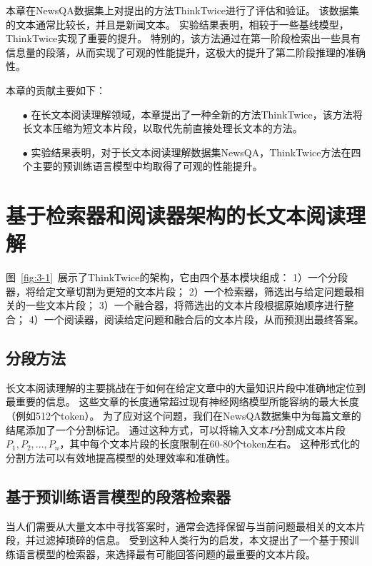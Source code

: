 本章在NewsQA数据集\cite{trischler2016newsqa}上对提出的方法ThinkTwice进行了评估和验证。
该数据集的文本通常比较长，并且是新闻文本。
实验结果表明，相较于一些基线模型\cite{devlin2018bert,joshi2020spanbert,tay2018densely}，ThinkTwice实现了重要的提升。
特别的，该方法通过在第一阶段检索出一些具有信息量的段落，从而实现了可观的性能提升，这极大的提升了第二阶段推理的准确性。

本章的贡献主要如下：
\begin{itemize}
    \item[$\bullet$] 在长文本阅读理解领域，本章提出了一种全新的方法ThinkTwice，该方法将长文本压缩为短文本片段，以取代先前直接处理长文本的方法。
    \item[$\bullet$] 实验结果表明，对于长文本阅读理解数据集NewsQA\cite{trischler2016newsqa}，ThinkTwice方法在四个主要的预训练语言模型\cite{devlin2018bert,liu2019roberta,lan2019albert,joshi2020spanbert}中均取得了可观的性能提升。
\end{itemize}


\section{基于检索器和阅读器架构的长文本阅读理解}
图~\ref{fig:3-1}~展示了ThinkTwice的架构，它由四个基本模块组成：
1）一个分段器，将给定文章切割为更短的文本片段；
2）一个检索器，筛选出与给定问题最相关的一些文本片段；
3）一个融合器，将筛选出的文本片段根据原始顺序进行整合；
4）一个阅读器，阅读给定问题和融合后的文本片段，从而预测出最终答案。

% 

\subsection{分段方法}
长文本阅读理解的主要挑战在于如何在给定文章中的大量知识片段中准确地定位到最重要的信息。
这些文章的长度通常超过现有神经网络模型所能容纳的最大长度（例如512个token）。
为了应对这个问题，我们在NewsQA数据集中为每篇文章的结尾添加了一个分割标记。
通过这种方式，可以将输入文本$P$分割成文本片段$P_1,P_2,...,P_n$，其中每个文本片段的长度限制在60-80个token左右。
这种形式化的分割方法可以有效地提高模型的处理效率和准确性。



\subsection{基于预训练语言模型的段落检索器}
当人们需要从大量文本中寻找答案时，通常会选择保留与当前问题最相关的文本片段，并过滤掉琐碎的信息。
受到这种人类行为的启发，本文提出了一个基于预训练语言模型的检索器，来选择最有可能回答问题的最重要的文本片段。

